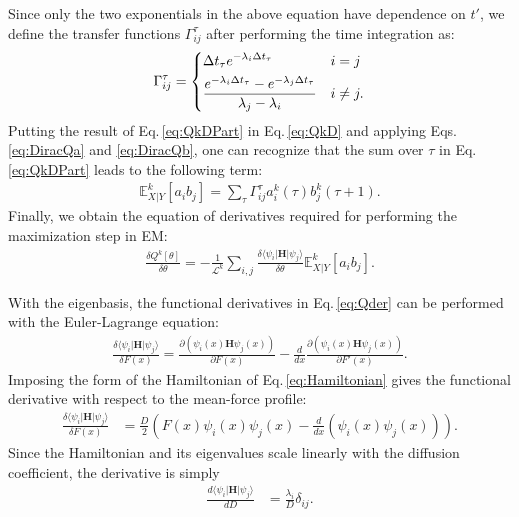 \documentclass[journal=jpcbfk,manuscript=article,layout=twocolumn,articletitle=true]{achemso}
\begin{document}
Since only the two exponentials in the above equation have dependence on $t'$, we define the transfer functions ${\Gamma_{ij}^{\tau}}$ after performing the time integration as:
\begin{equation}
{\Gamma_{ij}^{\tau}} = 
\begin{dcases}
\Delta t_{\tau} e^{-\lambda_i \Delta t_{\tau}} & i = j \\
\frac{e^{-\lambda_i \Delta t_{\tau}} - e^{-\lambda_j \Delta t_{\tau}}}{\lambda_j - \lambda_i} & i \neq j.
\end{dcases}
\end{equation} 
Putting the result of Eq.\,\ref{eq:QkDPart} in Eq.\,\ref{eq:QkD} and applying Eqs. \ref{eq:DiracQa} and \ref{eq:DiracQb}, one can recognize that the sum over $\tau$ in Eq.\,\ref{eq:QkDPart} leads to the following term:
\begin{align}
\mathbb{E}^k_{X|Y}[a_ib_j] =\sum_{\tau} \Gamma_{ij}^{\tau} a^k_i(\tau) b^k_j(\tau+1).
\end{align}
Finally, we obtain the equation of derivatives required for performing the maximization step in EM:
\begin{align}
\label{eq:Qder}
\frac{\delta Q^k[\theta]}{\delta \theta} = -\frac{1}{\mathcal{L}^k}\sum_{i,j} \frac{\delta \langle \psi_i | \bm{H} | \psi_j \rangle}{\delta \theta}  \mathbb{E}^k_{X|Y}[a_ib_j].
\end{align}

With the eigenbasis, the functional derivatives in Eq.\,\ref{eq:Qder} can be performed with the Euler-Lagrange equation:
\begin{align}
\frac{\delta \langle \psi_i|\bm{H}|\psi_j \rangle}{\delta F(x)} = \frac{\partial (\psi_i(x)\bm{H}\psi_j(x))}{\partial F(x)} - \frac{d}{dx}\frac{\partial (\psi_i(x)\bm{H}\psi_j(x))}{\partial F'(x)}.
\end{align}
Imposing the form of the Hamiltonian of Eq.\,\ref{eq:Hamiltonian} gives the functional derivative with respect to the mean-force profile:
\begin{align}
\label{eq:FuncDelF}
\frac{\delta \langle \psi_i|\bm{H}|\psi_j \rangle}{\delta F(x)} &= \frac{D}{2} \left( F(x)\psi_i(x)\psi_j(x) - \frac{d}{dx}\left( \psi_i(x)\psi_j(x) \right) \right).
\end{align}
Since the Hamiltonian and its eigenvalues scale linearly with the diffusion coefficient, the derivative is simply
\begin{align}
\label{eq:FuncDelD}
\frac{d \langle \psi_i|\bm{H}|\psi_j \rangle}{d D} & = \frac{\lambda_i}{D} \delta_{ij}.
\end{align}
\end{document}
